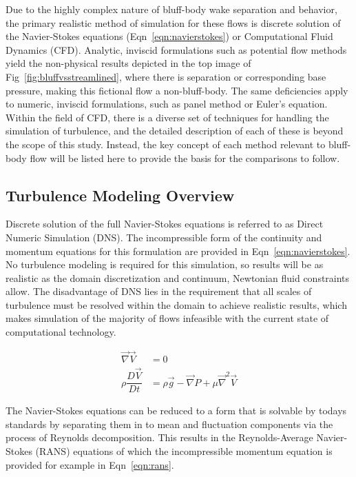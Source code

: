 \documentclass[journal]{new-aiaa}
\begin{document}
Due to the highly complex nature of bluff-body wake separation and behavior, the primary realistic method of simulation for these flows is discrete solution of the Navier-Stokes equations (Eqn~\ref{eqn:navierstokes}) or Computational Fluid Dynamics (CFD). Analytic, inviscid formulations such as potential flow methods yield the non-physical results depicted in the top image of Fig~\ref{fig:bluffvsstreamlined}, where there is separation or corresponding base pressure, making this fictional flow a non-bluff-body. The same deficiencies apply to numeric, inviscid formulations, such as panel method or Euler's equation. Within the field of CFD, there is a diverse set of techniques for handling the simulation of turbulence, and the detailed description of each of these is beyond the scope of this study. Instead, the key concept of each method relevant to bluff-body flow will be listed here to provide the basis for the comparisons to follow.


\subsection{Turbulence Modeling Overview} \label{subsec:turbulencemodeling}

 Discrete solution of the full Navier-Stokes equations is referred to as Direct Numeric Simulation (DNS). The incompressible form of the continuity and momentum equations for this formulation are provided in Eqn~\ref{eqn:navierstokes}. No turbulence modeling is required for this simulation, so results will be as realistic as the domain discretization and continuum, Newtonian fluid constraints allow. The disadvantage of DNS lies in the requirement that all scales of turbulence must be resolved within the domain to achieve realistic results, which makes simulation of the majority of flows infeasible with the current state of computational technology.

\begin{equation}
\label{eqn:navierstokes}
\begin{split}
\vec{\nabla}\vec{V} &= 0 \\
\rho \dfrac{D \vec{V}}{D t}
    &= \rho\vec{g} - \vec{\nabla} P + \mu \vec{\nabla}^2 \vec{V}
\end{split}
\end{equation}

The Navier-Stokes equations can be reduced to a form that is solvable by todays standards by separating them in to mean and fluctuation components via the process of Reynolds decomposition. This results in the Reynolds-Average Navier-Stokes (RANS) equations of which the incompressible momentum equation is provided for example in Eqn~\ref{eqn:rans}.
\end{document}
